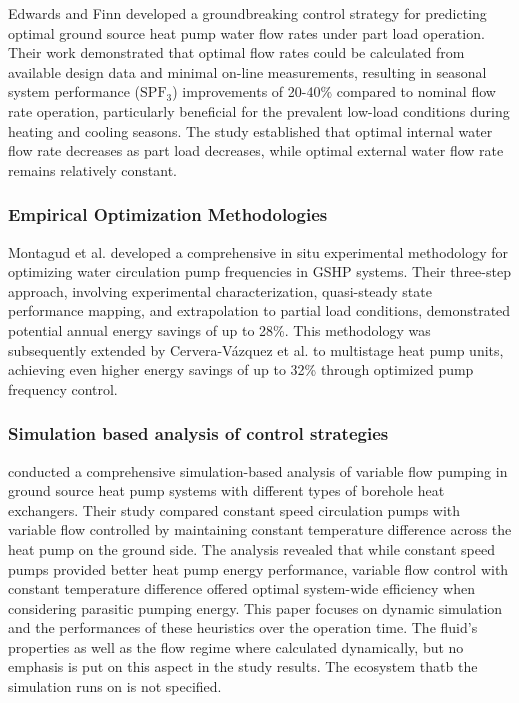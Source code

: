 \documentclass[journal=iecr,manuscript=]{achemso}
\begin{document}
Edwards and Finn \citep{edwards2015generalised} developed a
groundbreaking control strategy for predicting optimal ground source
heat pump water flow rates under part load operation. Their work
demonstrated that optimal flow rates could be calculated from available
design data and minimal on-line measurements, resulting in seasonal
system performance (\(\text{SPF}_3\)) improvements of 20-40\% compared
to nominal flow rate operation, particularly beneficial for the
prevalent low-load conditions during heating and cooling seasons. The
study established that optimal internal water flow rate decreases as
part load decreases, while optimal external water flow rate remains
relatively constant.

\subsubsection{Empirical Optimization
Methodologies}\label{empirical-optimization-methodologies}

Montagud et al. \citep{montagud2013situ} developed a comprehensive in
situ experimental methodology for optimizing water circulation pump
frequencies in GSHP systems. Their three-step approach, involving
experimental characterization, quasi-steady state performance mapping,
and extrapolation to partial load conditions, demonstrated potential
annual energy savings of up to 28\%. This methodology was subsequently
extended by Cervera-Vázquez et al. \citep{cervera2014situ} to multistage
heat pump units, achieving even higher energy savings of up to 32\%
through optimized pump frequency control.

\subsubsection{Simulation based analysis of control
strategies}\label{simulation-based-analysis-of-control-strategies}

\citet{zarrella2016simulation} conducted a comprehensive
simulation-based analysis of variable flow pumping in ground source heat
pump systems with different types of borehole heat exchangers. Their
study compared constant speed circulation pumps with variable flow
controlled by maintaining constant temperature difference across the
heat pump on the ground side. The analysis revealed that while constant
speed pumps provided better heat pump energy performance, variable flow
control with constant temperature difference offered optimal system-wide
efficiency when considering parasitic pumping energy. This paper focuses
on dynamic simulation and the performances of these heuristics over the
operation time. The fluid's properties as well as the flow regime where
calculated dynamically, but no emphasis is put on this aspect in the
study results. The ecosystem thatb the simulation runs on is not
specified.
\end{document}
